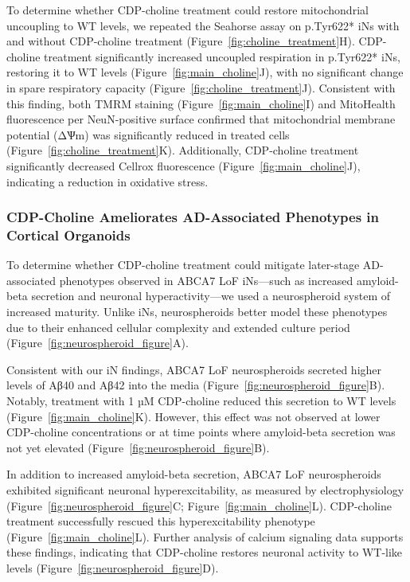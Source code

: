 To determine whether CDP-choline treatment could restore mitochondrial uncoupling to WT levels, we repeated the Seahorse assay on p.Tyr622* iNs with and without CDP-choline treatment (Figure~\ref{fig:choline_treatment}H). CDP-choline treatment significantly increased uncoupled respiration in p.Tyr622* iNs, restoring it to WT levels (Figure~\ref{fig:main_choline}J), with no significant change in spare respiratory capacity (Figure~\ref{fig:choline_treatment}J). Consistent with this finding, both TMRM staining (Figure~\ref{fig:main_choline}I) and MitoHealth fluorescence per NeuN-positive surface confirmed that mitochondrial membrane potential (ΔѰm) was significantly reduced in treated cells (Figure~\ref{fig:choline_treatment}K). Additionally, CDP-choline treatment significantly decreased Cellrox fluorescence (Figure~\ref{fig:main_choline}J), indicating a reduction in oxidative stress. 

\subsubsection{CDP-Choline Ameliorates AD-Associated Phenotypes in Cortical Organoids}
To determine whether CDP-choline treatment could mitigate later-stage AD-associated phenotypes observed in ABCA7 LoF iNs—such as increased amyloid-beta secretion and neuronal hyperactivity—we used a neurospheroid system of increased maturity. Unlike iNs, neurospheroids better model these phenotypes due to their enhanced cellular complexity and extended culture period (Figure~\ref{fig:neurospheroid_figure}A).

Consistent with our iN findings, ABCA7 LoF neurospheroids secreted higher levels of Aβ40 and Aβ42 into the media (Figure~\ref{fig:neurospheroid_figure}B). Notably, treatment with 1 µM CDP-choline reduced this secretion to WT levels (Figure~\ref{fig:main_choline}K). However, this effect was not observed at lower CDP-choline concentrations or at time points where amyloid-beta secretion was not yet elevated (Figure~\ref{fig:neurospheroid_figure}B).

In addition to increased amyloid-beta secretion, ABCA7 LoF neurospheroids exhibited significant neuronal hyperexcitability, as measured by electrophysiology (Figure~\ref{fig:neurospheroid_figure}C; Figure~\ref{fig:main_choline}L). CDP-choline treatment successfully rescued this hyperexcitability phenotype (Figure~\ref{fig:main_choline}L). Further analysis of calcium signaling data supports these findings, indicating that CDP-choline restores neuronal activity to WT-like levels (Figure~\ref{fig:neurospheroid_figure}D).

